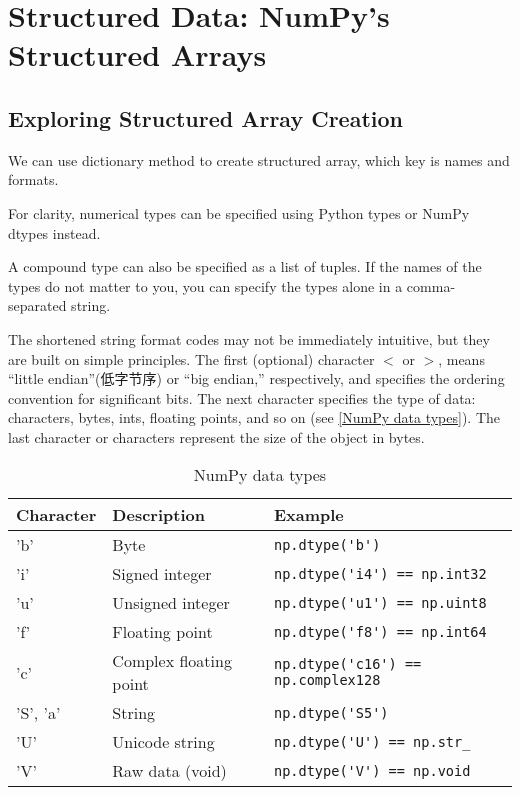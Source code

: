 \chapter{Structured Data: NumPy's Structured Arrays\label{Ch12}}
\section{Exploring Structured Array Creation}
We can use dictionary method to create structured array, which key is names and formats.

For clarity, numerical types can be specified using Python types or NumPy dtypes
instead.

A compound type can also be specified as a list of tuples. If the names of the types do not matter to you, you can specify the types alone in a
comma-separated string.

The shortened string format codes may not be immediately intuitive, but they are
built on simple principles. The first (optional) character $<$ or $>$, means “little endian”(低字节序)
or “big endian,” respectively, and specifies the ordering convention for significant
bits. The next character specifies the type of data: characters, bytes, ints, floating
points, and so on (see \autoref{NumPy data types}). The last character or characters represent the size
of the object in bytes.

\begin{table}
    \centering
    \caption{NumPy data types}
    \label{NumPy data types}
    \begin{tabular}{lll}
        \hline
        Character & Description            & Example                                 \\
        \hline
        'b'       & Byte                   & \verb|np.dtype('b')|                    \\
        'i'       & Signed integer         & \verb|np.dtype('i4') == np.int32|       \\
        'u'       & Unsigned integer       & \verb|np.dtype('u1') == np.uint8|       \\
        'f'       & Floating point         & \verb|np.dtype('f8') == np.int64|       \\
        'c'       & Complex floating point & \verb|np.dtype('c16') == np.complex128| \\
        'S', 'a'  & String                 & \verb|np.dtype('S5')|                   \\
        'U'       & Unicode string         & \verb|np.dtype('U') == np.str_|         \\
        'V'       & Raw data (void)        & \verb|np.dtype('V') == np.void|         \\
        \hline
    \end{tabular}
\end{table}

